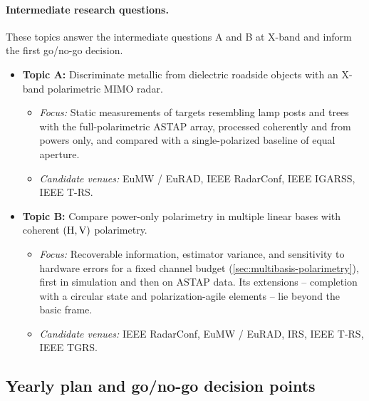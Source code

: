 \paragraph{Intermediate research questions.}
These topics answer the intermediate questions A and B at X-band and inform the first go/no-go decision.
\begin{itemize}
    \item \textbf{Topic A:} Discriminate metallic from dielectric roadside objects with an X-band polarimetric MIMO radar.
    \begin{itemize}
        \item \textit{Focus:} Static measurements of targets resembling lamp posts and trees with the full-polarimetric ASTAP array, processed coherently and from powers only, and compared with a single-polarized baseline of equal aperture.
        \item \textit{Candidate venues:} EuMW / EuRAD, IEEE RadarConf, IEEE IGARSS, IEEE T-RS.
    \end{itemize}

    \item \textbf{Topic B:} Compare power-only polarimetry in multiple linear bases with coherent $(\mathrm{H}, \mathrm{V})$ polarimetry.
    \begin{itemize}
        \item \textit{Focus:} Recoverable information, estimator variance, and sensitivity to hardware errors for a fixed channel budget (\cref{sec:multibasis-polarimetry}), first in simulation and then on ASTAP data.
        Its extensions -- completion with a circular state and polarization-agile elements -- lie beyond the basic frame.
        \item \textit{Candidate venues:} IEEE RadarConf, EuMW / EuRAD, IRS, IEEE T-RS, IEEE TGRS.
    \end{itemize}
\end{itemize}


\subsection{Yearly plan and go/no-go decision points}
\label{sec:yearly-plan}

